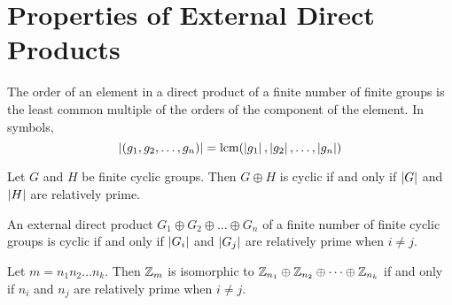 \section{Properties of External Direct Products}

\begin{theorem}
	The order of an element in a direct product of a finite number of finite groups is the least common multiple of the orders of the component of the element. In symbols,
	\[ \left\lvert (g_1,g_2,\dots,g_n) \right\rvert = \text{lcm}(\left\lvert g_1 \right\rvert,\left\lvert g_2 \right\rvert,\dots,\left\lvert g_n \right\rvert) \]
\end{theorem}

\begin{theorem}
	Let $G$ and $H$ be finite cyclic groups. Then $G \oplus H$ is cyclic if and only if $\left\lvert G \right\rvert$ and $\left\lvert H \right\rvert$ are relatively prime.
\end{theorem}

\begin{corollary}
	An external direct product $G_1 \oplus G_2 \oplus \dots \oplus G_n$ of a finite number of finite cyclic groups is cyclic if and only if $\left\lvert G_i \right\rvert$ and $\left\lvert G_j \right\rvert$ are relatively prime when $i \neq j$.
\end{corollary}

\begin{corollary}
	Let $m = n_1n_2\dots n_k$. Then $\mathbb{Z}_m$ is isomorphic to $\mathbb{Z}_{n_1} \oplus \mathbb{Z}_{n_2} \oplus \dots \oplus \mathbb{Z}_{n_k}$ if and only if $n_i$ and $n_j$ are relatively prime when $i \neq j$.
\end{corollary}
